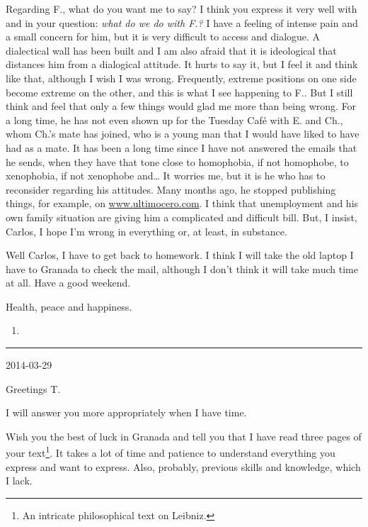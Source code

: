 \documentclass[]{book}
\let\rmarkdownfootnote\footnote%
\def\footnote{\protect\rmarkdownfootnote}
\begin{document}
Regarding F., what do you want me to say? I think you express it very well with and in your question: \emph{what do we do with F.?} I have a feeling of intense pain and a small concern for him, but it is very difficult to access and dialogue. A dialectical wall has been built and I am also afraid that it is ideological that distances him from a dialogical attitude. It hurts to say it, but I feel it and think like that, although I wish I was wrong. Frequently, extreme positions on one side become extreme on the other, and this is what I see happening to F.. But I still think and feel that only a few things would glad me more than being wrong. For a long time, he has not even shown up for the Tuesday Café with E. and Ch., whom Ch.'s mate has joined, who is a young man that I would have liked to have had as a mate. It has been a long time since I have not answered the emails that he sends, when they have that tone close to homophobia, if not homophobe, to xenophobia, if not xenophobe and\ldots{} It worries me, but it is he who has to reconsider regarding his attitudes. Many months ago, he stopped publishing things, for example, on \href{http://ultimocero.com/}{www.ultimocero.com}. I think that unemployment and his own family situation are giving him a complicated and difficult bill. But, I insist, Carlos, I hope I'm wrong in everything or, at least, in substance.

Well Carlos, I have to get back to homework. I think I will take the old laptop I have to Granada to check the mail, although I don't think it will take much time at all. Have a good weekend.

Health, peace and happiness.

\begin{enumerate}
\def\labelenumi{\Alph{enumi}.}
\setcounter{enumi}{19}
\item
\end{enumerate}

\begin{center}\rule{0.5\linewidth}{\linethickness}\end{center}

2014-03-29

Greetings T.

I will answer you more appropriately when I have time.

Wish you the best of luck in Granada and tell you that I have read three pages of your text\footnote{An intricate philosophical text on Leibniz.}. It takes a lot of time and patience to understand everything you express and want to express. Also, probably, previous skills and knowledge, which I lack.
\end{document}
